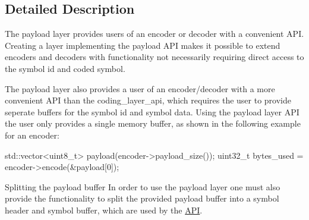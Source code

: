 \subsection{Detailed Description}
The payload layer provides users of an encoder or decoder with a convenient A\-P\-I. Creating a layer implementing the payload A\-P\-I makes it possible to extend encoders and decoders with functionality not necessarily requiring direct access to the symbol id and coded symbol.

The payload layer also provides a user of an encoder/decoder with a more convenient A\-P\-I than the coding\-\_\-layer\-\_\-api, which requires the user to provide seperate buffers for the symbol id and symbol data. Using the payload layer A\-P\-I the user only provides a single memory buffer, as shown in the following example for an encoder\-:


\begin{DoxyCode}
std::vector<uint8\_t> payload(encoder->payload\_size());
uint32\_t bytes\_used = encoder->encode(&payload[0]);
\end{DoxyCode}


Splitting the payload buffer In order to use the payload layer one must also provide the functionality to split the provided payload buffer into a symbol header and symbol buffer, which are used by the \hyperlink{group__codec__header__api}{A\-P\-I}. 